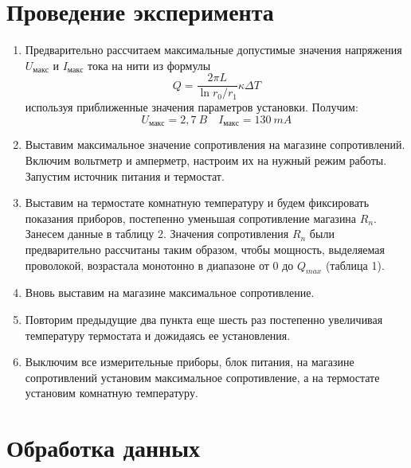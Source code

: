 \documentclass[12pt, a4paper]{article}
\begin{document}
\section{Проведение эксперимента}

\begin{enumerate}

\item Предварительно рассчитаем максимальные допустимые значения напряжения $U_{макс}$ и $I_{макс}$ тока на нити из формулы
\[Q=\frac{2\pi L}{\ln r_0/r_1}\kappa\Delta T\]
используя приближенные значения параметров установки. Получим:
\[U_{макс}=2,7\ B\quad I_{макс}=130\ mA\]

\item Выставим максимальное значение сопротивления на магазине сопротивлений. Включим вольтметр и амперметр, настроим их на нужный режим работы. Запустим источник питания и термостат.

\item Выставим на термостате комнатную температуру и будем фиксировать показания приборов, постепенно уменьшая сопротивление магазина $R_n$. Занесем данные в таблицу 2.
Значения сопротивления $R_n$ были предварительно рассчитаны таким образом, чтобы мощность, выделяемая проволокой, возрастала монотонно в диапазоне от $0$ до $Q_{max}$ (таблица 1).

\item Вновь выставим на магазине максимальное сопротивление.

\item Повторим предыдущие два пункта еще шесть раз постепенно увеличивая температуру термостата и дожидаясь ее установления.

\item Выключим все измерительные приборы, блок питания, на магазине сопротивлений установим максимальное сопротивление, а на термостате установим комнатную температуру.

\end{enumerate}
\section{Обработка данных}
\end{document}
